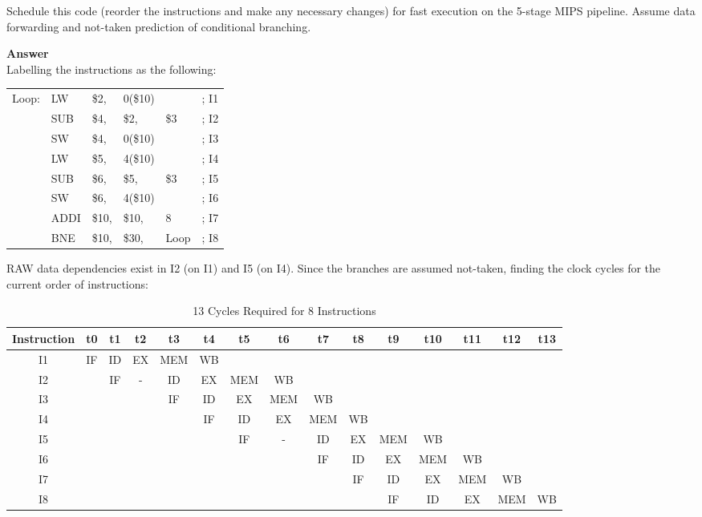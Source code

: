 \documentclass[paper=usletter, fontsize=12pt]{article}
\begin{document}
\begin{enumerate}
        Schedule this code (reorder the instructions and make any necessary changes) for fast execution on the 5-stage MIPS pipeline. Assume data forwarding and not-taken prediction of conditional branching.

        \textbf{Answer} \\
        Labelling the instructions as the following:

        \begin{table}[h]
            \centering
            \begin{tabular*}{200pt}{@{\extracolsep{\fill}} llllll}
            Loop:   & LW & \$2, & 0(\$10) & & ; I1 \\
                    & SUB & \$4, & \$2, & \$3 & ; I2 \\
                    & SW & \$4, & 0(\$10) & & ; I3 \\
                    & LW & \$5, & 4(\$10) & & ; I4 \\
                    & SUB & \$6, & \$5, & \$3 & ; I5 \\
                    & SW & \$6, & 4(\$10) & & ; I6 \\
                    & ADDI & \$10, & \$10, & 8 & ; I7 \\
                    & BNE & \$10, & \$30, & Loop & ; I8 \\
            \end{tabular*}
        \end{table}

        RAW data dependencies exist in I2 (on I1) and I5 (on I4). Since the branches are assumed not-taken, finding the clock cycles for the current order of instructions:

        \begin{table}[h]
            \caption{13 Cycles Required for 8 Instructions}
            \centering
            \begin{tabular*}{500pt}{@{\extracolsep{\fill}} c|cccccccccccccc}

            \textbf{Instruction} & \textbf{t0} & \textbf{t1} & \textbf{t2} & \textbf{t3} & \textbf{t4} & \textbf{t5} & \textbf{t6} & \textbf{t7} & \textbf{t8} & \textbf{t9} & \textbf{t10} & \textbf{t11} & \textbf{t12} & \textbf{t13} \\
            \hline
            I1 & IF & ID & EX & MEM & WB & & & & & & & & & \\
            I2 & & IF & - & ID & EX & MEM & WB & & & & & & & \\
            I3 & & & & IF & ID & EX & MEM & WB & & & & & & \\
            I4 & & & & & IF & ID & EX & MEM & WB & & & & & \\
            I5 & & & & & & IF & - & ID & EX & MEM & WB & & & \\
            I6 & & & & & & & & IF & ID & EX & MEM & WB & & \\
            I7 & & & & & & & & & IF & ID & EX & MEM & WB & \\
            I8 & & & & & & & & & & IF & ID & EX & MEM & WB \\
            \end{tabular*}
        \end{table}
        \newpage


\end{enumerate}
\end{document}
